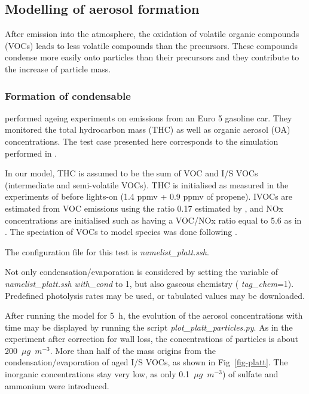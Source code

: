 \documentclass[a4paper,11pt]{article}
\begin{document}
{{\subsection{Modelling of aerosol formation}

After emission into the atmosphere, the oxidation of volatile organic compounds (VOCs) leads to less volatile compounds than the precursors. 
These compounds condense more easily onto particles than their precursors and they contribute to the increase of particle mass.

\subsubsection{Formation of condensable}

\cite{platt2013secondary} performed ageing experiments on emissions from an Euro 5 gasoline car. They monitored the total hydrocarbon mass (THC) as well as organic aerosol (OA) concentrations. 
The test case presented here corresponds to the simulation performed in \cite{sartelet2018}.

In our model, THC is assumed to be the sum of VOC and I/S VOCs (intermediate and semi-volatile VOCs). THC is initialised as measured in the experiments of \cite{platt2013secondary} before lights-on (1.4 ppmv + 0.9 ppmv of propene). IVOCs are estimated from VOC emissions using the ratio 0.17 estimated by \cite{zhao2016intermediate}, and NOx concentrations are initialised such as having a VOC/NOx ratio equal to 5.6 as in \cite{platt2013secondary} . 
The speciation of VOCs to model species was done following \cite{theloke2007}.

The configuration file for this test is {\it{namelist\_platt.ssh}}.

Not only condensation/evaporation is considered by setting the variable of {\it{namelist\_platt.ssh}} {\it{with\_cond}} to 1, but also gaseous chemistry ( {\it{tag\_chem}}=1). Predefined photolysis rates may be used, or tabulated values may be downloaded.

After running the model for 5~h, the evolution of the aerosol concentrations with time may be displayed by running the script {\it{plot\_platt\_particles.py}}.
As in the experiment after correction for wall loss, the concentrations of
particles is about 200~$\mu g$~$m^{-3}$. More than half of the mass origins
from the condensation/evaporation of aged I/S VOCs, as shown in Fig~\ref{fig-platt}.
The inorganic concentrations stay very low, as only 0.1~$\mu g$~$m^{-3}$) of sulfate and ammonium were introduced.

}}
\end{document}
